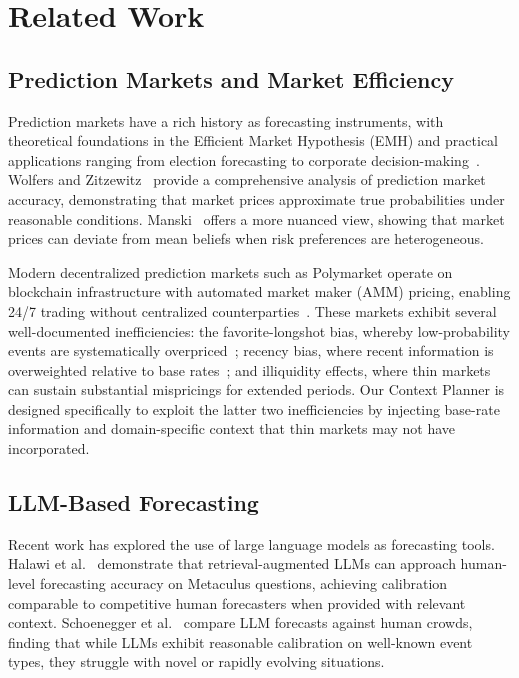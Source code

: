 \section{Related Work}
\label{sec:related}

\subsection{Prediction Markets and Market Efficiency}

Prediction markets have a rich history as forecasting instruments, with theoretical foundations in the Efficient Market Hypothesis (EMH) and practical applications ranging from election forecasting to corporate decision-making~\cite{arrow2008promise}. Wolfers and Zitzewitz~\cite{wolfers2004prediction} provide a comprehensive analysis of prediction market accuracy, demonstrating that market prices approximate true probabilities under reasonable conditions. Manski~\cite{manski2006interpreting} offers a more nuanced view, showing that market prices can deviate from mean beliefs when risk preferences are heterogeneous.

Modern decentralized prediction markets such as Polymarket operate on blockchain infrastructure with automated market maker (AMM) pricing, enabling 24/7 trading without centralized counterparties~\cite{chen2007utility}. These markets exhibit several well-documented inefficiencies: the favorite-longshot bias, whereby low-probability events are systematically overpriced~\cite{snowberg2010explaining}; recency bias, where recent information is overweighted relative to base rates~\cite{rothschild2009forecasting}; and illiquidity effects, where thin markets can sustain substantial mispricings for extended periods. Our Context Planner is designed specifically to exploit the latter two inefficiencies by injecting base-rate information and domain-specific context that thin markets may not have incorporated.

\subsection{LLM-Based Forecasting}

Recent work has explored the use of large language models as forecasting tools. Halawi et al.~\cite{halawi2024approaching} demonstrate that retrieval-augmented LLMs can approach human-level forecasting accuracy on Metaculus questions, achieving calibration comparable to competitive human forecasters when provided with relevant context. Schoenegger et al.~\cite{schoenegger2024wisdom} compare LLM forecasts against human crowds, finding that while LLMs exhibit reasonable calibration on well-known event types, they struggle with novel or rapidly evolving situations.


